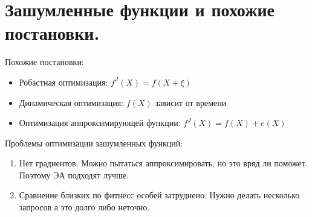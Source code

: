\section{Зашумленные функции и похожие постановки.}


Похожие постановки:
\begin{itemize}
    \item Робастная оптимизация: $f^J(X) = f(X + \xi)$
    \item Динамическая оптимизация: $f(X)$ зависит от времени
    \item Оптимизация аппроксимирующей функции:
    $f^J(X) = f(X) + e(X)$
\end{itemize}

Проблемы оптимизации зашумленных функций:
\begin{enumerate}
    \item Нет градиентов. Можно пытаться аппроксимировать, но
    это вряд ли поможет. Поэтому ЭА подходят лучше.
    \item Сравнение близких по фитнесс особей затруднено.
    Нужно делать несколько запросов а это долго либо неточно.
\end{enumerate}
